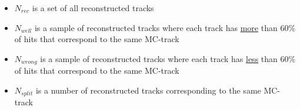 \documentclass[dvipsnames, aspectratio=43] {beamer}
\begin{document}
\begin{frame}
\begin{columns}[t]
\begin{block}{}
\begin{itemize}
      \item {\tiny {\color{blue} $N_{rec}$} is a set of all reconstructed tracks}
      \item {\tiny {\color{blue} $N_{well}$} is a sample of reconstructed tracks where
        each track has \underline{more} than 60\% of hits that correspond to the same MC-track}
      \item {\tiny {\color{blue} $N_{wrong}$} is a sample of reconstructed tracks where
        each track has \underline{less} than 60\% of hits that correspond to the same MC-track}
      \item {\tiny {\color{blue} $N_{split}$} is a number of reconstructed tracks corresponding
        to the same MC-track}
      \end{itemize}
    \end{block}
  \end{columns}
\end{frame}
\end{document}
